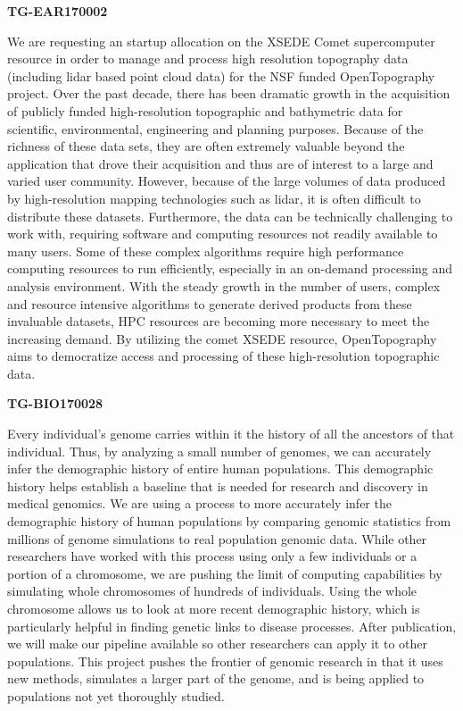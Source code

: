 \textbf{TG-EAR170002}

We are requesting an startup allocation on the XSEDE Comet supercomputer
resource in order to manage and process high resolution topography data
(including lidar based point cloud data) for the NSF funded
OpenTopography project. Over the past decade, there has been dramatic
growth in the acquisition of publicly funded high-resolution topographic
and bathymetric data for scientific, environmental, engineering and
planning purposes. Because of the richness of these data sets, they are
often extremely valuable beyond the application that drove their
acquisition and thus are of interest to a large and varied user
community. However, because of the large volumes of data produced by
high-resolution mapping technologies such as lidar, it is often
difficult to distribute these datasets. Furthermore, the data can be
technically challenging to work with, requiring software and computing
resources not readily available to many users. Some of these complex
algorithms require high performance computing resources to run
efficiently, especially in an on-demand processing and analysis
environment. With the steady growth in the number of users, complex and
resource intensive algorithms to generate derived products from these
invaluable datasets, HPC resources are becoming more necessary to meet
the increasing demand. By utilizing the comet XSEDE resource,
OpenTopography aims to democratize access and processing of these
high-resolution topographic data.

\textbf{TG-BIO170028}

Every individual's genome carries within it the history of all the
ancestors of that individual. Thus, by analyzing a small number of
genomes, we can accurately infer the demographic history of entire human
populations. This demographic history helps establish a baseline that is
needed for research and discovery in medical genomics. We are using a
process to more accurately infer the demographic history of human
populations by comparing genomic statistics from millions of genome
simulations to real population genomic data. While other researchers
have worked with this process using only a few individuals or a portion
of a chromosome, we are pushing the limit of computing capabilities by
simulating whole chromosomes of hundreds of individuals. Using the whole
chromosome allows us to look at more recent demographic history, which
is particularly helpful in finding genetic links to disease processes.
After publication, we will make our pipeline available so other
researchers can apply it to other populations. This project pushes the
frontier of genomic research in that it uses new methods, simulates a
larger part of the genome, and is being applied to populations not yet
thoroughly studied.


